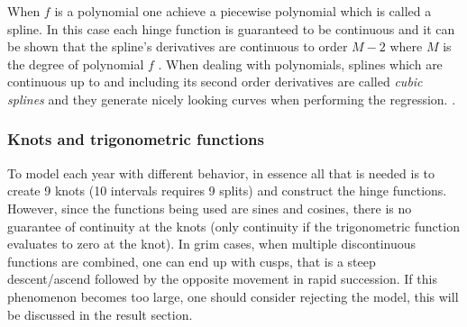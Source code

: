 When $f$ is a polynomial one achieve a piecewise polynomial which is called a spline.
In this case each hinge function is guaranteed to be continuous and it can be shown that the spline's derivatives are continuous to order $M-2$ where $M$ is the degree of polynomial $f$ \cite[p.~144]{statistical-learning}. When dealing with polynomials, splines which are continuous up to and including its second order derivatives are called \textit{cubic splines} and they generate nicely looking curves when performing the regression. \cite[p.~143]{statistical-learning}.

\subsubsection{Knots and trigonometric functions}
To model each year with different behavior, in essence all that is needed is to create 9 knots (10 intervals requires 9 splits) and construct the hinge functions.
However, since the functions being used are sines and cosines, there is no guarantee of continuity at the knots (only continuity if the trigonometric function evaluates to zero at the knot).
In grim cases, when multiple discontinuous functions are combined, one can end up with cusps, that is a steep descent/ascend followed by the opposite movement in rapid succession.
If this phenomenon becomes too large, one should consider rejecting the model, this will be discussed in the result section. 
